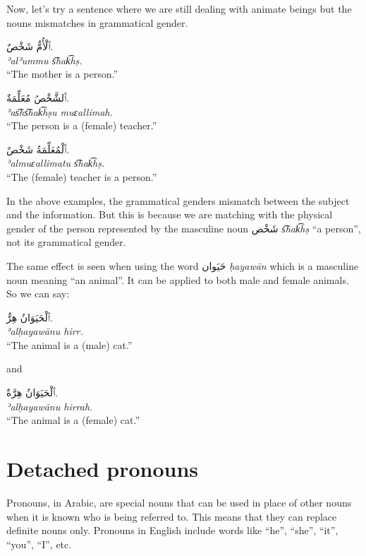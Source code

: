 \documentclass[
  10pt,
]{book}
\begin{document}
Now, let's try a sentence where we are still dealing with animate beings but the nouns mismatches in grammatical gender.

\foreignlanguage{arabic}{ٱَلْأُمُّ شَخْصٌ.}\\
\emph{ʾalʾummu s͡hak͡hṣ.}\\
\enquote{The mother is a person.}

\foreignlanguage{arabic}{ٱَلشَّخْصُ مُعَلِّمَةٌ.}\\
\emph{ʾas͡hs͡hak͡hṣu muɛallimah.}\\
\enquote{The person is a (female) teacher.}

\foreignlanguage{arabic}{ٱَلْمُعَلِّمَةُ شَخْصٌ.}\\
\emph{ʾalmuɛallimatu s͡hak͡hṣ.}\\
\enquote{The (female) teacher is a person.}

In the above examples, the grammatical genders mismatch between the subject and the information. But this is because we are matching with the physical gender of the person represented by the masculine noun \foreignlanguage{arabic}{شَخْص} \emph{s͡hak͡hṣ} \enquote{a person}, not its grammatical gender.

The same effect is seen when using the word \foreignlanguage{arabic}{حَيَوان} \emph{ḥayawān} which is a masculine noun meaning \enquote{an animal}. It can be applied to both male and female animals. So we can say:

\foreignlanguage{arabic}{ٱَلْحَيَوَانُ هِرٌّ.}\\
\emph{ʾalḥayawānu hirr.}\\
\enquote{The animal is a (male) cat.}

and

\foreignlanguage{arabic}{ٱَلْحَيَوَانُ هِرَّةٌ.}\\
\emph{ʾalḥayawānu hirrah.}\\
\enquote{The animal is a (female) cat.}

\section{Detached pronouns}\label{detached-pronouns}

Pronouns, in Arabic, are special nouns that can be used in place of other nouns when it is known who is being referred to. This means that they can replace definite nouns only. Pronouns in English include words like \enquote{he}, \enquote{she}, \enquote{it}, \enquote{you}, \enquote{I}, etc.
\end{document}
